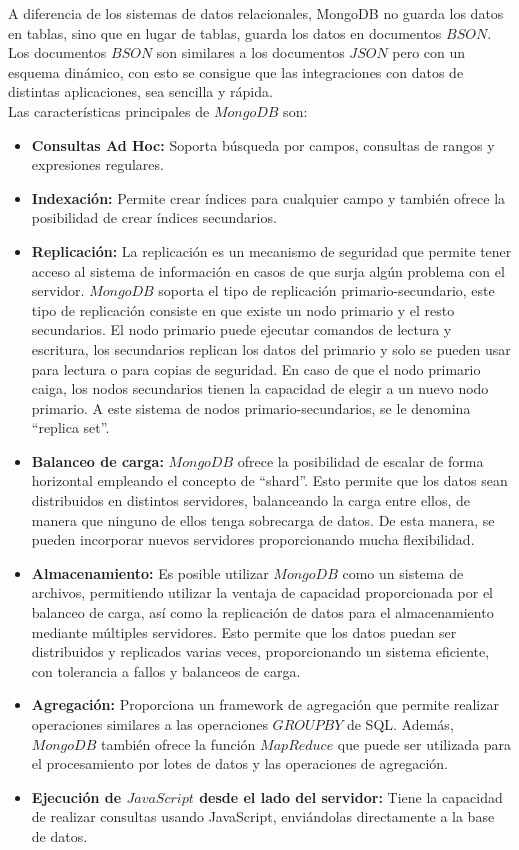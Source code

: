 \documentclass[12pt,a4paper]{article}
\begin{document}
A diferencia de los sistemas de datos relacionales, MongoDB no guarda los datos en tablas, sino que en lugar de tablas, guarda los datos en documentos $BSON$. Los documentos $BSON$ son similares a los documentos $JSON$ pero con un esquema dinámico, con esto se consigue que las integraciones con datos de distintas aplicaciones, sea sencilla y rápida. \\


Las características principales de $MongoDB$ son:

\begin{itemize}
	\item \textbf{Consultas Ad Hoc:}
	Soporta búsqueda por campos, consultas de rangos y expresiones regulares.
	
	\item \textbf{Indexación:}
	 Permite crear índices para cualquier campo y también ofrece la posibilidad de crear índices secundarios. 

	\item \textbf{Replicación:}
	 La replicación es un mecanismo de seguridad que permite tener acceso al sistema de información en casos de que surja algún problema con el servidor. $MongoDB$ soporta el tipo de replicación primario-secundario, este tipo de replicación consiste en que existe un nodo primario y el resto secundarios. El nodo primario puede ejecutar comandos de lectura y escritura, los secundarios replican los datos del primario y solo se pueden usar para lectura o para copias de seguridad. En caso de que el nodo primario caiga, los nodos secundarios tienen la capacidad de elegir a un nuevo nodo primario. A este sistema de nodos primario-secundarios, se le denomina “replica set”.

	\item \textbf{Balanceo de carga:}
	$MongoDB$ ofrece la posibilidad de escalar de forma horizontal empleando el concepto de “shard”. Esto permite que los datos sean distribuidos en distintos servidores, balanceando la carga entre ellos, de manera que ninguno de ellos tenga sobrecarga de datos. De esta manera, se pueden incorporar nuevos servidores proporcionando mucha flexibilidad.
	\item \textbf{Almacenamiento:} 
	Es posible utilizar $MongoDB$ como un sistema de archivos, permitiendo utilizar la ventaja de capacidad proporcionada por el balanceo de carga, así como la replicación de datos para el almacenamiento mediante múltiples servidores. Esto permite que los datos puedan ser distribuidos y replicados varias veces, proporcionando un sistema eficiente, con tolerancia a fallos y balanceos de carga.
	\item \textbf{Agregación:}
	Proporciona un framework de agregación que permite realizar operaciones similares a las operaciones $GROUP BY$ de SQL. Además, $MongoDB$ también ofrece la función $MapReduce$ que puede ser utilizada para el procesamiento por lotes de datos y las operaciones de agregación.
	\item \textbf{Ejecución de $JavaScript$ desde el lado del servidor: }
	Tiene la capacidad de realizar consultas usando JavaScript, enviándolas directamente a la base de datos.

\end{itemize}
\end{document}
